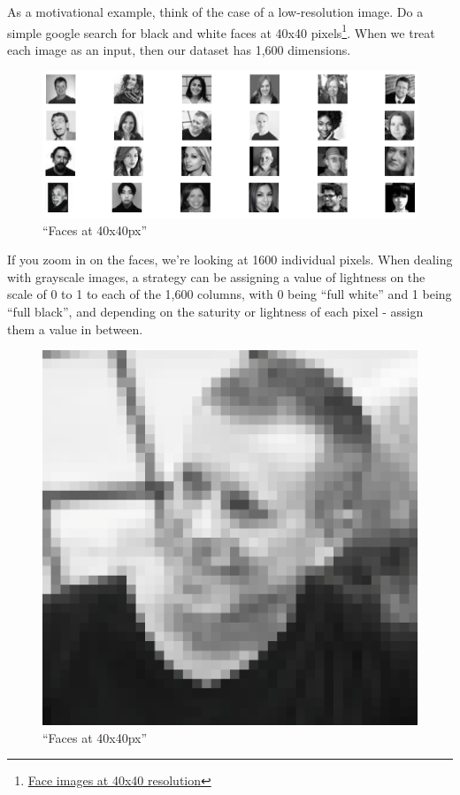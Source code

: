 \documentclass[]{article}
\let\rmarkdownfootnote\footnote%
\def\footnote{\protect\rmarkdownfootnote}
\begin{document}
As a motivational example, think of the case of a low-resolution image.
Do a simple google search for black and white faces at 40x40
pixels\footnote{\href{https://www.google.co.id/search?q=face\&as_st=y\&hl=en\&tbas=0\&tbs=ic:gray,isz:ex,iszw:40,iszh:40,itp:photo\&tbm=isch\&source=lnt\&sa=X\&ved=0ahUKEwi29vqT-eHaAhULs48KHVD_AUgQpwUIHg\&biw=1306\&bih=632\&dpr=1.8}{Face
  images at 40x40 resolution}}. When we treat each image as an input,
then our dataset has 1,600 dimensions.

\begin{figure}
\centering
\includegraphics{assets/face.png}
\caption{``Faces at 40x40px''}
\end{figure}

If you zoom in on the faces, we're looking at 1600 individual pixels.
When dealing with grayscale images, a strategy can be assigning a value
of lightness on the scale of 0 to 1 to each of the 1,600 columns, with 0
being ``full white'' and 1 being ``full black'', and depending on the
saturity or lightness of each pixel - assign them a value in between.

\begin{figure}
\centering
\includegraphics{assets/face1.png}
\caption{``Faces at 40x40px''}
\end{figure}
\end{document}
